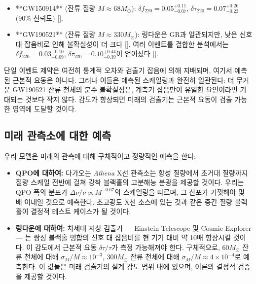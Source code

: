 \documentclass[12pt,a4paper]{article}
\begin{document}
	\begin{itemize}
		\item **GW150914** (잔류 질량 \(M \approx 68 M_\odot\)): \(\delta f_{220} = 0.05^{+0.11}_{-0.07}\), \(\delta \tau_{220} = 0.07^{+0.26}_{-0.23}\) (90\% 신뢰도) [\cite{Ghosh2021}].
		\item **GW190521** (잔류 질량 \(M \approx 330 M_\odot\)): 링다운은 GR과 일관되지만, 낮은 신호 대 잡음비로 인해 불확실성이 더 크다 [\cite{Abbott2020b}]. 여러 이벤트를 결합한 분석에서는 \(\delta f_{220} = 0.03^{+0.10}_{-0.09}\), \(\delta \tau_{220} = 0.10^{+0.44}_{-0.39}\)이 얻어졌다 [\cite{Ghosh2021}].
	\end{itemize}
	
	단일 이벤트 제약은 여전히 통계적 오차와 검출기 잡음에 의해 지배되며, 여기서 예측된 근본적 요동은 아니다. 그러나 이들은 예측된 스케일링과 완전히 일관된다: 더 무거운 GW190521 잔류 천체의 분수 불확실성은, 계측기 잡음만이 유일한 요인이라면 기대되는 것보다 작지 않다. 감도가 향상되면 미래의 검출기는 근본적 요동이 검출 가능한 영역에 도달할 것이다.
	
	\subsection{미래 관측소에 대한 예측}
	
	우리 모델은 미래의 관측에 대해 구체적이고 정량적인 예측을 한다:
	
	\begin{itemize}
		\item \textbf{QPO에 대하여:} 다가오는 \textit{Athena} X선 관측소는 항성 질량에서 초거대 질량까지 질량 스케일 전반에 걸쳐 강착 블랙홀의 고분해능 분광을 제공할 것이다. 우리는 QPO 폭의 분포가 \(\Delta\nu/\nu \propto M^{-0.67}\)의 스케일링을 따르며, 그 산포가 기껏해야 몇 배 이내일 것으로 예측한다. 초고광도 X선 소스에 있는 것과 같은 중간 질량 블랙홀이 결정적 테스트 케이스가 될 것이다.
		
		\item \textbf{링다운에 대하여:} 차세대 지상 검출기 — Einstein Telescope 및 Cosmic Explorer — 는 쌍성 블랙홀 병합의 신호 대 잡음비를 현 기기 대비 약 10배 향상시킬 것이다. 이 감도에서 근본적 요동 \(\delta\tau/\tau\)가 측정 가능해져야 한다. 구체적으로, \(60 M_\odot\) 잔류 천체에 대해 \(\sigma_M/M \approx 10^{-3}\), \(300 M_\odot\) 잔류 천체에 대해 \(\sigma_M/M \approx 4 \times 10^{-4}\)로 예측한다. 이 값들은 미래 검출기의 설계 감도 범위 내에 있으며, 이론의 결정적 검증을 제공할 것이다.
	\end{itemize}
	
\end{document}

